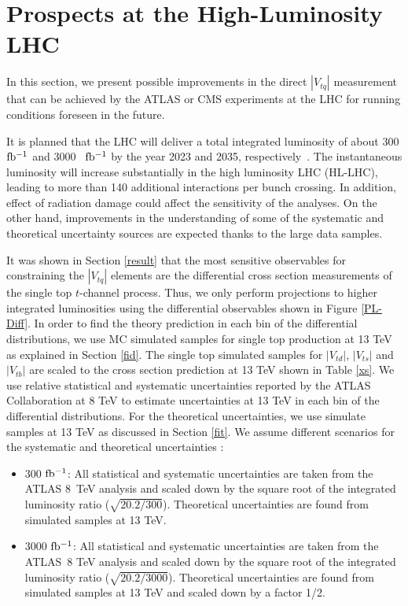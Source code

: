 \documentclass[11pt]{article}
\newcommand{\VTD}{|V_{td}|}
\newcommand{\VTS}{|V_{ts}|}
\newcommand{\VTB}{|V_{tb}|}
\newcommand{\VTQ}{|V_{tq}|}
\begin{document}
\clearpage



\section{Prospects at the High-Luminosity LHC}
In this section, we present possible improvements in the direct $\VTQ$ measurement that  can  be achieved by the ATLAS or CMS experiments at the LHC for running conditions foreseen in the future.

It is planned that the LHC will deliver a total integrated luminosity of about 300 $\rm fb^{-1}$ and 3000~ $\rm fb^{-1}$ by the year 2023 and 2035, respectively~\cite{ATLAS:1502664,CMSCollaboration:2015zni}.
The instantaneous luminosity will increase substantially in the high luminosity LHC (HL-LHC), leading to more than 140 additional interactions per bunch crossing.   In addition, effect of radiation damage  could affect the sensitivity of the analyses. On the other hand,  improvements in the understanding of some of the systematic and theoretical uncertainty sources are expected thanks to the large data samples.


It was shown in Section \ref{result} that the most sensitive observables for constraining the $\VTQ$ elements are the differential cross section measurements of the single top $t$-channel process.
Thus, we only perform projections to higher integrated luminosities  using the differential observables  shown in Figure \ref{PL-Diff}. In order to find the theory prediction in each bin of the differential distributions, we use MC simulated samples for single top production at 13 TeV as  explained in Section \ref{fid}. The single top simulated samples for  $\VTD$, $\VTS$ and $\VTB$ are scaled to the cross section prediction at 13 TeV shown in Table \ref{xs}.
We use relative statistical and systematic uncertainties reported by the ATLAS Collaboration at 8 TeV \cite{Aaboud:2017pdi} to estimate uncertainties at 13 TeV in each bin of the differential distributions.
For the theoretical uncertainties, we use simulate samples at 13 TeV as  discussed in Section \ref{fit}.
We assume different scenarios for the systematic and theoretical uncertainties \cite{CMS-PAS-FTR-16-002,CMS-PAS-FTR-13-016}:
 \begin{itemize}
 \item 300 $\rm fb^{-1}$: All statistical and systematic uncertainties are taken from the ATLAS 8~TeV analysis \cite{Aaboud:2017pdi} and  scaled down by the square root of the integrated luminosity ratio ($\sqrt{20.2/300}$).  Theoretical uncertainties are found from simulated samples at 13 TeV.
 \item 3000 $\rm fb^{-1}$: All statistical and systematic uncertainties are taken from the ATLAS~8 TeV analysis \cite{Aaboud:2017pdi} and  scaled down by the square root of the integrated luminosity ratio ($\sqrt{20.2/3000}$).  Theoretical uncertainties are found from simulated samples at 13 TeV and scaled down by a factor 1/2.
 \end{itemize}
\end{document}

